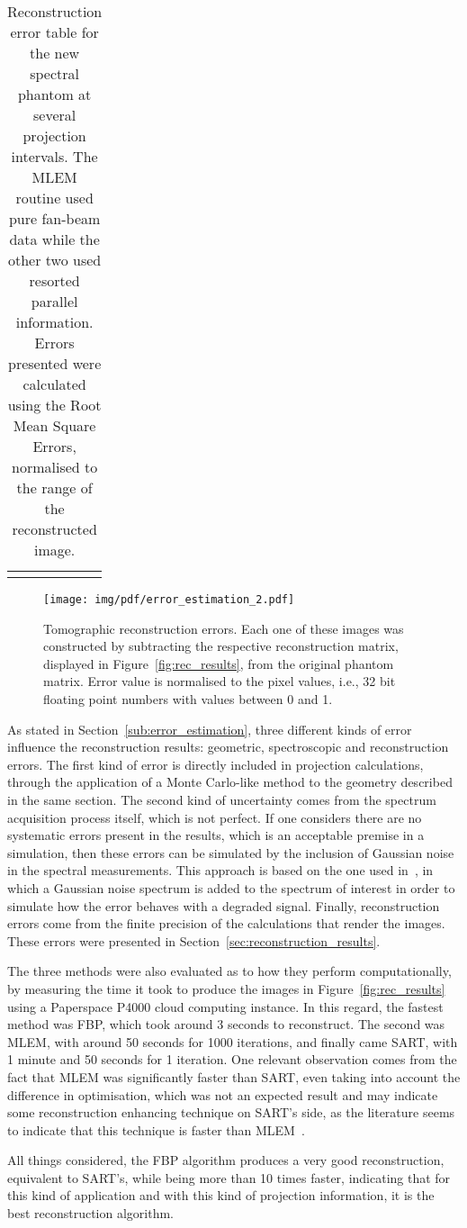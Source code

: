 \begin{table}[htpb]
    \centering
    \caption{Reconstruction error table for the new spectral phantom at
        several projection intervals. The MLEM routine used pure
        fan-beam data while the other two used resorted parallel
        information. Errors presented were calculated using the Root
        Mean Square Errors, normalised to the range of the reconstructed
        image. }
    \label{tab:rec_errors}
    \begin{tabular}{c}
        \missingfigure{}
    \end{tabular}
\end{table}

\begin{figure}[htpb]
    \centering
    \texttt{[image: img/pdf/error\_estimation\_2.pdf]}
    \caption{Tomographic reconstruction errors. Each one of these images
        was constructed by subtracting the respective reconstruction
        matrix, displayed in Figure~\ref{fig:rec_results}, from the
        original phantom matrix. Error value is normalised to the pixel
        values, i.e., 32 bit floating point numbers with values between
        0 and 1.}
    \label{fig:rec_errors}
\end{figure}

As stated in Section~\ref{sub:error_estimation}, three different kinds
of error influence the reconstruction results: geometric, spectroscopic
and reconstruction errors. The first kind of error is directly included
in projection calculations, through the application of a Monte
Carlo-like method to the geometry described in the same section. The
second kind of uncertainty comes from the spectrum acquisition process
itself, which is not perfect.  If one considers there are no systematic
errors present in the results, which is an acceptable premise in a
simulation, then these errors can be simulated by the inclusion of
Gaussian noise in the spectral measurements. This approach is based on
the one used in~\cite{Stutz1996}, in which a Gaussian noise spectrum is
added to the spectrum of interest in order to simulate how the error
behaves with a degraded signal. Finally, reconstruction errors come from
the finite precision of the calculations that render the images. These
errors were presented in Section~\ref{sec:reconstruction_results}.

The three methods were also evaluated as to how they perform
computationally, by measuring the time it took to produce the images in
Figure~\ref{fig:rec_results} using a Paperspace P4000 cloud computing
instance. In this regard, the fastest method was FBP, which took around
3 seconds to reconstruct. The second was MLEM, with around 50 seconds
for 1000 iterations, and finally came SART, with 1 minute and 50 seconds
for 1 iteration. One relevant observation comes from the fact that MLEM
was significantly faster than SART, even taking into account the
difference in optimisation, which was not an expected result and may
indicate some reconstruction enhancing technique on SART's side, as the
literature seems to indicate that this technique is faster than
MLEM~\cite{Defrise2003}.

All things considered, the FBP algorithm produces a very good
reconstruction, equivalent to SART's, while being more than 10 times
faster, indicating that for this kind of application and with this kind
of projection information, it is the best reconstruction algorithm.
